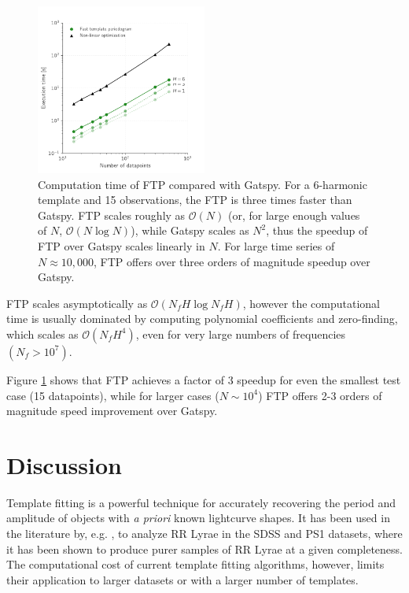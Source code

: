 \documentclass[apj]{emulateapj}
\newcommand{\bigO}{\mathcal{O}}
\begin{document}
\begin{figure}
    \centering
    \includegraphics[width=0.5\textwidth]{plots/timing_vs_ndata.pdf}
    \caption{\label{fig:timingndata} Computation time of FTP compared with Gatspy. For a 6-harmonic
             template and 15 observations, the FTP is three times faster than 
             Gatspy. FTP scales roughly as $\bigO(N)$ (or, for large enough values
             of $N$, $\bigO(N\log N)$), while Gatspy scales as $N^2$, thus the speedup of FTP
             over Gatspy scales linearly in $N$. For large time series of $N\approx 10,000$,
             FTP offers over three orders of magnitude speedup over Gatspy.}
\end{figure}

FTP scales asymptotically as $\bigO(N_fH\log N_fH)$, however the computational
time is usually dominated by computing polynomial coefficients and zero-finding,
which scales as $\bigO(N_f H^4)$, even for very large numbers of frequencies
$(N_f > 10^7)$. 

Figure \ref{fig:timingndata} shows that FTP achieves a factor of 3 speedup for
even the smallest test case (15 datapoints), while for larger cases ($N\sim10^4$)
FTP offers 2-3 orders of magnitude speed improvement over Gatspy. 

\section{Discussion}\label{sec:discussion}

Template fitting is a powerful technique for accurately recovering
the period and amplitude of objects with \emph{a priori} known
lightcurve shapes. It has been used in the literature by, e.g.
\cite{Sesar_etal_2016, Sesar_etal_2010}, to analyze RR Lyrae in the
SDSS and PS1 datasets, where it has been shown to produce purer
samples of RR Lyrae at a given completeness. The computational
cost of current template fitting algorithms, however, limits their
application to larger datasets or with a larger number of templates.
\end{document}
